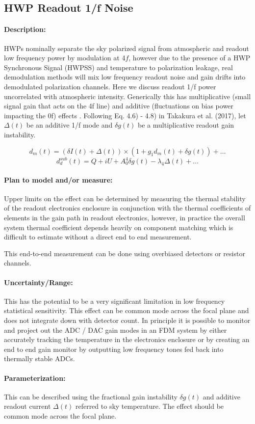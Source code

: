 
\subsection{HWP Readout 1/f Noise}


\paragraph{Description:}

HWPs nominally separate the sky polarized signal from atmospheric and readout low frequency power by modulation at 4$f$, however due to the presence of a HWP Synchronous Signal (HWPSS) and temperature to polarization leakage, real demodulation methods will mix low frequency readout noise and gain drifts into demodulated polarization channels. 
Here we discuss readout 1/f power uncorrelated with atmospheric intensity. Generically this has multiplicative (small signal gain that acts on the 4f line) and additive (fluctuations on bias power impacting the 0f) effects . Following Eq. 4.6) - 4.8) in Takakura et al. (2017), let $\Delta(t)$ be an additive 1/f mode and $\delta g(t)$ be a multiplicative readout gain instability.

$$
d_{m}(t) = (\delta I (t) + \Delta (t)) \times (1 + g_{1}d_{m}(t) + \delta g(t)) + …
$$
$$
d_{d}^{sub}(t) = Q + iU + A_{0}^{4} \delta g(t) - \lambda_{4} \Delta (t) + …
$$

\paragraph{Plan to model and/or measure:}

Upper limits on the effect can be determined by measuring the thermal stability of the readout electronics enclosure in conjunction with the thermal coefficients of elements in the gain path in readout electronics, however, in practice the overall system thermal coefficient depends heavily on component matching which is difficult to estimate without a direct end to end measurement.

This end-to-end measurement can be done using overbiased detectors or resistor channels. 

\paragraph{Uncertainty/Range:}

This has the potential to be a very significant limitation in low frequency statistical sensitivity. This effect can be common mode across the focal plane and does not integrate down with detector count. In principle it is possible to monitor and project out the ADC / DAC gain modes in an FDM system by either accurately tracking the temperature in the electronics enclosure or by creating an end to end gain monitor by outputting low frequency tones fed back into thermally stable ADCs.


\paragraph{Parameterization:}

This can be described using the fractional gain instability $\delta g(t)$ and additive readout current $\Delta (t)$ referred to sky temperature. The effect should be common mode across the focal plane.
